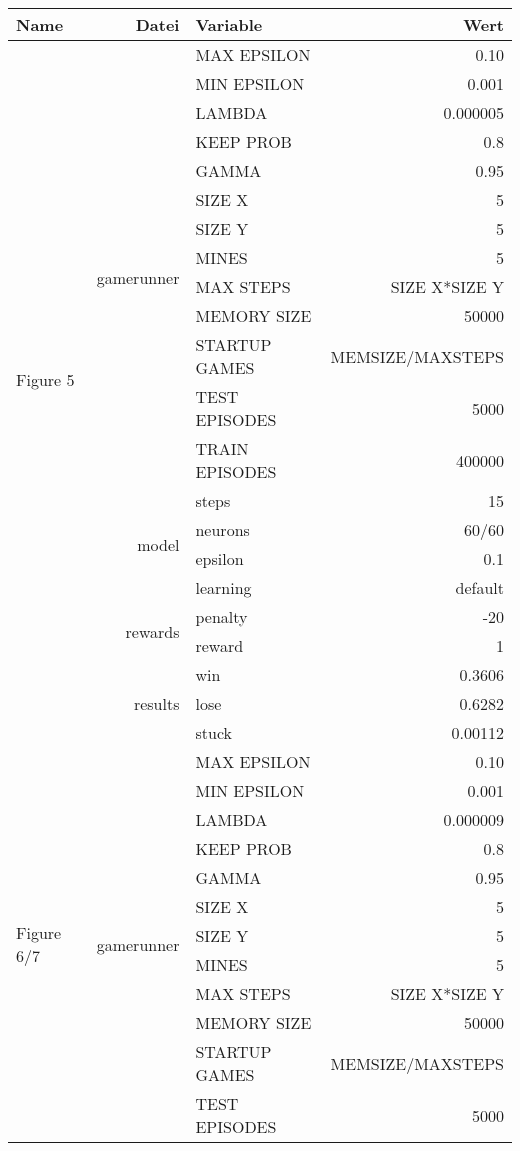 \documentclass[9pt]{article}
\begin{document}
\begin{tabularx}{\textwidth}{l|r|X|r}
	Name & Datei & Variable & Wert \\
	\hline
	\multirow{21}{*}{Figure 5} & \multirow{14}{*}{gamerunner} & MAX EPSILON	& 0.10\\
	& & MIN EPSILON	& 0.001 \\
	& & LAMBDA & 0.000005 \\
	& & KEEP PROB & 0.8 \\
	& & GAMMA	& 0.95 \\
	& & SIZE X & 5 \\
	& & SIZE Y & 5 \\
	& & MINES & 5 \\
	& & MAX STEPS & SIZE X*SIZE Y\\
	& & MEMORY SIZE & 50000 \\
	& & STARTUP GAMES & MEMSIZE/MAXSTEPS \\
	& & TEST EPISODES & 5000 \\
	& & TRAIN EPISODES & 400000 \\
	& & steps & 15\\\cline{2-4}
	& \multirow{2}{*}{model} & neurons & 60/60 \\ 
	& & epsilon & 0.1\\
	& & learning & default \\\cline{2-4}
	& \multirow{2}{*}{rewards} & penalty & -20\\
	& & reward & 1\\\cline{2-4}
	& \multirow{3}{*}{results} & win & 0.3606\\
	& & lose & 0.6282\\
	& & stuck & 0.00112\\
	\hline
	\hline
	\multirow{21}{*}{Figure 6/7} & \multirow{14}{*}{gamerunner} & MAX EPSILON	& 0.10\\
	& & MIN EPSILON	& 0.001 \\
	& & LAMBDA & 0.000009 \\
	& & KEEP PROB & 0.8 \\
	& & GAMMA	& 0.95 \\
	& & SIZE X & 5 \\
	& & SIZE Y & 5 \\
	& & MINES & 5 \\
	& & MAX STEPS & SIZE X*SIZE Y\\
	& & MEMORY SIZE & 50000 \\
	& & STARTUP GAMES & MEMSIZE/MAXSTEPS \\
	& & TEST EPISODES & 5000 \\

\end{tabularx}
\end{document}
